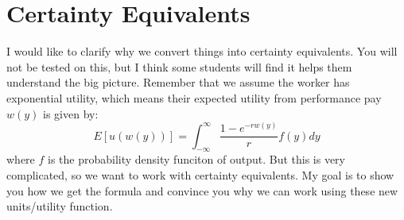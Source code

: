\documentclass{article}
\begin{document}
\section{Certainty Equivalents}

I would like to clarify why we convert things into certainty equivalents. You will not be tested on this, but I think some students will find it helps them understand the big picture. Remember that we assume the worker has exponential utility, which means their expected utility from performance pay $w(y)$ is given by:
\[E [u(w(y))] = \int^{\infty}_{-\infty}  \frac{1-e^{-r w(y)}}{r}f(y)dy\]
where $f$ is the probability density funciton of output.  But this is very complicated, so we want to work with certainty equivalents. My goal is to show you how we get the formula and convince you why we can work using these new units/utility function.
\end{document}
